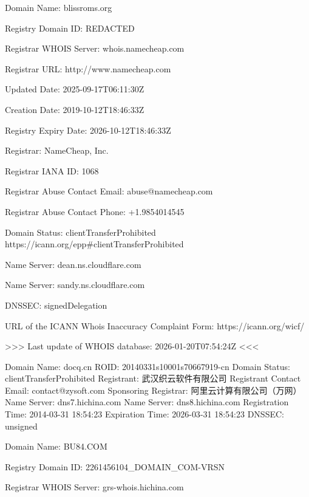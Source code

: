 \documentclass[
]{article}
\newenvironment{Shaded}{}{}
\newcommand{\NormalTok}[1]{#1}
\begin{document}
\begin{Shaded}
\begin{Highlighting}[]
\NormalTok{Domain Name: blissroms.org}

\NormalTok{Registry Domain ID: REDACTED}

\NormalTok{Registrar WHOIS Server: whois.namecheap.com}

\NormalTok{Registrar URL: http://www.namecheap.com}

\NormalTok{Updated Date: 2025{-}09{-}17T06:11:30Z}

\NormalTok{Creation Date: 2019{-}10{-}12T18:46:33Z}

\NormalTok{Registry Expiry Date: 2026{-}10{-}12T18:46:33Z}

\NormalTok{Registrar: NameCheap, Inc.}

\NormalTok{Registrar IANA ID: 1068}

\NormalTok{Registrar Abuse Contact Email: abuse@namecheap.com}

\NormalTok{Registrar Abuse Contact Phone: +1.9854014545}

\NormalTok{Domain Status: clientTransferProhibited https://icann.org/epp\#clientTransferProhibited}

\NormalTok{Name Server: dean.ns.cloudflare.com}

\NormalTok{Name Server: sandy.ns.cloudflare.com}

\NormalTok{DNSSEC: signedDelegation}

\NormalTok{URL of the ICANN Whois Inaccuracy Complaint Form: https://icann.org/wicf/}

\NormalTok{\textgreater{}\textgreater{}\textgreater{} Last update of WHOIS database: 2026{-}01{-}20T07:54:24Z \textless{}\textless{}\textless{}}

\NormalTok{Domain Name: docq.cn}
\NormalTok{ROID: 20140331s10001s70667919{-}cn}
\NormalTok{Domain Status: clientTransferProhibited}
\NormalTok{Registrant: 武汉织云软件有限公司}
\NormalTok{Registrant Contact Email: contact@zysoft.com}
\NormalTok{Sponsoring Registrar: 阿里云计算有限公司（万网）}
\NormalTok{Name Server: dns7.hichina.com}
\NormalTok{Name Server: dns8.hichina.com}
\NormalTok{Registration Time: 2014{-}03{-}31 18:54:23}
\NormalTok{Expiration Time: 2026{-}03{-}31 18:54:23}
\NormalTok{DNSSEC: unsigned}


\NormalTok{Domain Name: BU84.COM}

\NormalTok{   Registry Domain ID: 2261456104\_DOMAIN\_COM{-}VRSN}

\NormalTok{   Registrar WHOIS Server: grs{-}whois.hichina.com}


\end{Highlighting}
\end{Shaded}
\end{document}
